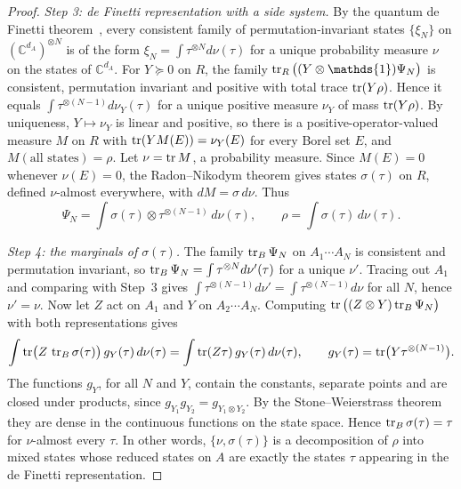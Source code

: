 \documentclass[aps,pra,twocolumn,showpacs,superscriptaddress,groupedaddress]{revtex4-2}
\newcommand{\one}[0]{\mathds{1}}
\newcommand{\C}{\mathds{C}}
\newcommand{\I}{\one}
\begin{document}
\begin{widetext}
\begin{proof}
    \emph{Step 3: de Finetti representation with a side system.} By the quantum de Finetti theorem~\cite{Stormer1969,HudsonMoody1976}, every consistent family of permutation-invariant states $\{\xi_N\}$ on $(\C^{d_A})^{\otimes N}$ is of the form $\xi_N=\int\tau^{\otimes N}d\nu(\tau)$ for a unique probability measure $\nu$ on the states of $\C^{d_A}$. For $Y\succeq0$ on $R$, the family $\tr_R\big((Y\otimes\I)\Psi_N\big)$ is consistent, permutation invariant and positive with total trace $\tr(Y\rho)$. Hence it equals $\int\tau^{\otimes(N-1)}d\nu_Y(\tau)$ for a unique positive measure $\nu_Y$ of mass $\tr(Y\rho)$. By uniqueness, $Y\mapsto\nu_Y$ is linear and positive, so there is a positive-operator-valued measure $M$ on $R$ with $\tr(YM(E))=\nu_Y(E)$ for every Borel set $E$, and $M(\text{all states})=\rho$. Let $\nu=\tr M$, a probability measure. Since $M(E)=0$ whenever $\nu(E)=0$, the Radon--Nikodym theorem gives states $\sigma(\tau)$ on $R$, defined $\nu$-almost everywhere, with $dM=\sigma\,d\nu$. Thus
    \begin{equation}
        \Psi_N=\int\sigma(\tau)\otimes\tau^{\otimes(N-1)}\,d\nu(\tau),
        \qquad
        \rho=\int\sigma(\tau)\,d\nu(\tau).
    \end{equation}

    \emph{Step 4: the marginals of $\sigma(\tau)$.} The family $\tr_B\Psi_N$ on $A_1\cdots A_N$ is consistent and permutation invariant, so $\tr_B\Psi_N=\int\tau^{\otimes N}d\nu'(\tau)$ for a unique $\nu'$. Tracing out $A_1$ and comparing with Step~3 gives $\int\tau^{\otimes(N-1)}d\nu'=\int\tau^{\otimes(N-1)}d\nu$ for all $N$, hence $\nu'=\nu$. Now let $Z$ act on $A_1$ and $Y$ on $A_2\cdots A_N$. Computing $\tr\big((Z\otimes Y)\tr_B\Psi_N\big)$ with both representations gives
    \begin{equation}
        \int\tr\!\big(Z\,\tr_B\sigma(\tau)\big)\,g_Y(\tau)\,d\nu(\tau)=\int\tr(Z\tau)\,g_Y(\tau)\,d\nu(\tau),
        \qquad g_Y(\tau)=\tr\!\big(Y\tau^{\otimes(N-1)}\big).
    \end{equation}
    The functions $g_Y$, for all $N$ and $Y$, contain the constants, separate points and are closed under products, since $g_{Y_1}g_{Y_2}=g_{Y_1\otimes Y_2}$. By the Stone--Weierstrass theorem they are dense in the continuous functions on the state space. Hence $\tr_B\sigma(\tau)=\tau$ for $\nu$-almost every $\tau$. In other words, $\{\nu,\sigma(\tau)\}$ is a decomposition of $\rho$ into mixed states whose reduced states on $A$ are exactly the states $\tau$ appearing in the de Finetti representation.


\end{proof}
\end{widetext}
\end{document}

